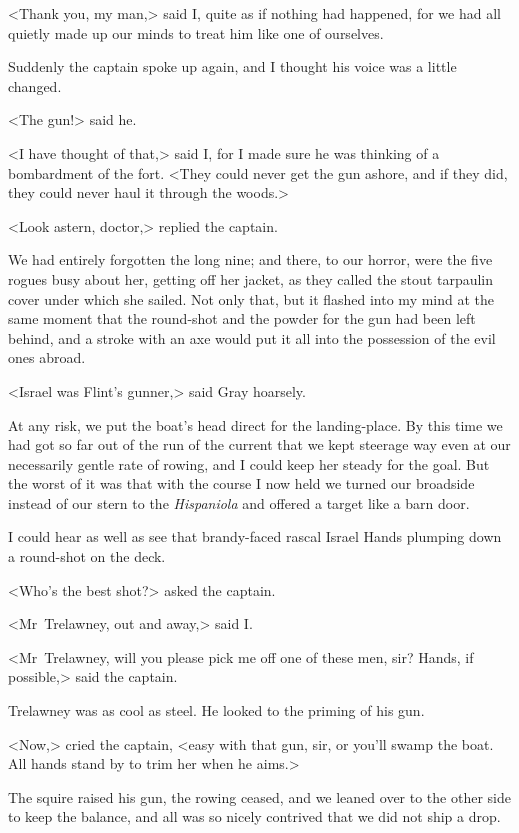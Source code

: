 <Thank you, my man,> said I, quite as if nothing had happened, for we had all quietly made up our minds to treat him like one of ourselves.

Suddenly the captain spoke up again, and I thought his voice was a little changed.

<The gun!> said he.

<I have thought of that,> said I, for I made sure he was thinking of a bombardment of the fort. <They could never get the gun ashore, and if they did, they could never haul it through the woods.>

<Look astern, doctor,> replied the captain.

We had entirely forgotten the long nine; and there, to our horror, were the five rogues busy about her, getting off her jacket, as they called the stout tarpaulin cover under which she sailed. Not only that, but it flashed into my mind at the same moment that the round-shot and the powder for the gun had been left behind, and a stroke with an axe would put it all into the possession of the evil ones abroad.

<Israel was Flint's gunner,> said Gray hoarsely.

At any risk, we put the boat's head direct for the landing-place. By this time we had got so far out of the run of the current that we kept steerage way even at our necessarily gentle rate of rowing, and I could keep her steady for the goal. But the worst of it was that with the course I now held we turned our broadside instead of our stern to the \textit{Hispaniola} and offered a target like a barn door.

I could hear as well as see that brandy-faced rascal Israel Hands plumping down a round-shot on the deck.

<Who's the best shot?> asked the captain.

<Mr~Trelawney, out and away,> said I\@.

<Mr~Trelawney, will you please pick me off one of these men, sir? Hands, if possible,> said the captain.

Trelawney was as cool as steel. He looked to the priming of his gun.

<Now,> cried the captain, <easy with that gun, sir, or you'll swamp the boat. All hands stand by to trim her when he aims.>

The squire raised his gun, the rowing ceased, and we leaned over to the other side to keep the balance, and all was so nicely contrived that we did not ship a drop.


